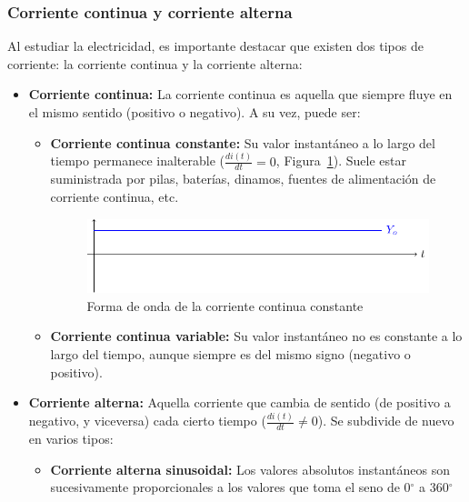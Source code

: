 	\subsubsection{Corriente continua y corriente
          alterna} \label{sec.cc-ca} Al estudiar la electricidad, es
        importante destacar que existen dos tipos de corriente: la
        corriente continua y la corriente alterna:
	\begin{itemize}
        \item \textbf{Corriente continua:} La corriente continua es
          aquella que siempre fluye en el mismo sentido (positivo o
          negativo). A su vez, puede ser:
          \begin{itemize}
          \item \textbf{Corriente continua constante:} Su valor
            instantáneo a lo largo del tiempo permanece inalterable
            ($\frac{di(t)}{dt} = 0$, Figura~\ref{fig:continua}). Suele
            estar suministrada por pilas, baterías, dinamos, fuentes
            de alimentación de corriente continua, etc.
            \begin{figure}[H]
              \centering
              \includegraphics[width=0.75\linewidth]{../figs/continua.pdf}
              \caption{Forma de onda de la corriente continua
                constante}
              \label{fig:continua}
            \end{figure}
          \item \textbf{Corriente continua variable:} Su valor
            instantáneo no es constante a lo largo del tiempo, aunque
            siempre es del mismo signo (negativo o positivo).
          \end{itemize}
        \item \textbf{Corriente alterna:} Aquella corriente que cambia
          de sentido (de positivo a negativo, y viceversa) cada cierto
          tiempo ($\frac{di(t)}{dt} \neq 0$). Se subdivide de nuevo en
          varios tipos:
          \begin{itemize}
          \item \textbf{Corriente alterna sinusoidal:} Los valores
            absolutos instantáneos son sucesivamente proporcionales a
            los valores que toma el seno de 0$^\circ$ a 360$^\circ$

\end{itemize}
\end{itemize}
